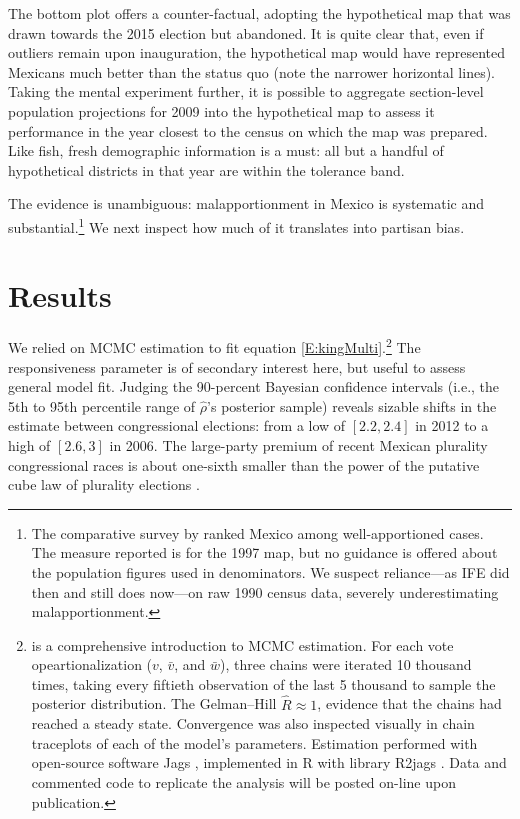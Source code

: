 \documentclass[letter,12pt]{article}
\begin{document}
The bottom plot offers a counter-factual, adopting the hypothetical map that was drawn towards the 2015 election but abandoned. It is quite clear that, even if outliers remain upon inauguration, the hypothetical map would have represented Mexicans much better than the status quo (note the narrower horizontal lines). Taking the mental experiment further, it is possible to aggregate section-level population projections for 2009 into the hypothetical map to assess it performance in the year closest to the census on which the map was prepared. Like fish, fresh demographic information is a must: all but a handful of hypothetical districts in that year are within the tolerance band. 

The evidence is unambiguous: malapportionment in Mexico is systematic and substantial.\footnote{The comparative survey by \citet{snyder.samuelsMalapp2004} ranked Mexico among well-apportioned cases. The measure reported is for the 1997 map, but no guidance is offered about the population figures used in denominators. We suspect reliance---as IFE did then and still does now---on raw 1990 census data, severely underestimating malapportionment.} We next inspect how much of it translates into partisan bias. 







\section{Results}

We relied on MCMC estimation to fit equation \ref{E:kingMulti}.\footnote{\citet{gelman.hill.2007} is a comprehensive introduction to MCMC estimation. For each vote opeartionalization ($v$, $\bar{v}$, and $\bar{w}$), three chains were iterated 10 thousand times, taking every fiftieth observation of the last 5 thousand to sample the posterior distribution. The Gelman--Hill $\hat{R} \approx 1$, evidence that the chains had reached a steady state. Convergence was also inspected visually in chain traceplots of each of the model's parameters. Estimation performed with open-source software Jags \citep{jags.cite}, implemented in R \citep{r.cite} with library R2jags \citep{r.r2jags}. Data and commented code to replicate the analysis will be posted on-line upon publication.} The responsiveness parameter is of secondary interest here, but useful to assess general model fit. Judging the 90-percent Bayesian confidence intervals (i.e., the 5th to 95th percentile range of $\hat{\rho}$'s posterior sample) reveals sizable shifts in the estimate between congressional elections: from a low of $[2.2,2.4]$ in 2012 to a high of $[2.6,3]$ in 2006. The large-party premium of recent Mexican plurality congressional races is about one-sixth smaller than the power of the putative cube law of plurality elections \citep{taagepera.CubeLaw.1973}. 
\end{document}
